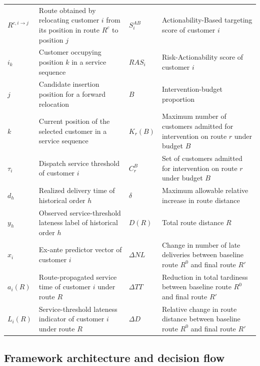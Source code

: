 \documentclass[11pt,a4paper]{article}
\begin{document}
\begin{table}[htbp]
\begin{tabularx}{\textwidth}{@{}l>{\raggedright\arraybackslash}Xl>{\raggedright\arraybackslash}X@{}}
$R^{c,i \rightarrow j}$ & Route obtained by relocating customer $i$ from its position in route $R^{c}$ to position $j$ & $S_{i}^{AB}$ & Actionability-Based targeting score of customer $i$ \\
$i_{k}$ & Customer occupying position $k$ in a service sequence & $RAS_{i}$ & Risk-Actionability score of customer $i$ \\
$j$ & Candidate insertion position for a forward relocation & $B$ & Intervention-budget proportion \\
$k$ & Current position of the selected customer in a service sequence & $K_{r}(B)$ & Maximum number of customers admitted for intervention on route $r$ under budget $B$ \\
$\tau_{i}$ & Dispatch service threshold of customer $i$ & $C_{r}^{B}$ & Set of customers admitted for intervention on route $r$ under budget $B$ \\
$d_{h}$ & Realized delivery time of historical order $h$ & $\delta$ & Maximum allowable relative increase in route distance \\
$y_{h}$ & Observed service-threshold lateness label of historical order $h$ & $D(R)$ & Total route distance $R$ \\
$x_{i}$ & Ex-ante predictor vector of customer $i$ & $\Delta NL$ & Change in number of late deliveries between baseline route $R^{0}$ and final route $R'$ \\
$a_{i}(R)$ & Route-propagated service time of customer $i$ under route $R$ & $\Delta TT$ & Reduction in total tardiness between baseline route $R^{0}$ and final route $R'$ \\
$L_{i}(R)$ & Service-threshold lateness indicator of customer $i$ under route $R$ & $\Delta D$ & Relative change in route distance between baseline route $R^{0}$ and final route $R'$ \\
\bottomrule
\end{tabularx}
\end{table}

\subsection{Framework architecture and decision flow}\label{sec:framework-architecture}
\end{document}
